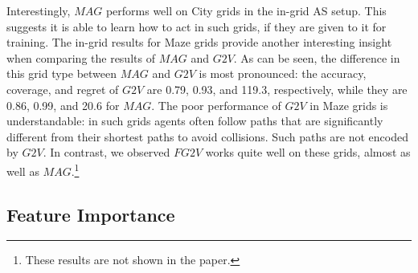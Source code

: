 \documentclass[letterpaper]{article} %
\newcommand{\gtv}[1]{\ensuremath{\textit{G2V}}\xspace}
\newcommand{\fgtv}[1]{\ensuremath{\textit{FG2V}}\xspace}
\newcommand{\mapfgas}[1]{\ensuremath{\textit{MAG}}\xspace}
\begin{document}
Interestingly, \mapfgas\ performs well on City grids in the in-grid AS setup. This suggests it is able to learn how to act in such grids, if they are given to it for training.
The in-grid results for Maze grids provide another interesting insight when comparing the results of \mapfgas\ and \gtv\ . As can be seen, the difference in this grid type between \mapfgas\ and \gtv\ is most pronounced: the accuracy, coverage, and regret of \gtv\ are 0.79, 0.93, and 119.3, respectively, while they are 0.86, 0.99, and 20.6 for \mapfgas\ .
The poor performance of \gtv\ in Maze grids is understandable: in such grids agents often follow paths that are significantly different from their shortest paths to avoid collisions. Such paths are not encoded by \gtv\ . In contrast, we observed   \fgtv\ works quite well on these grids, almost as well as \mapfgas\ .\footnote{These results are not shown in the paper.}




\subsection{Feature Importance}
\end{document}
